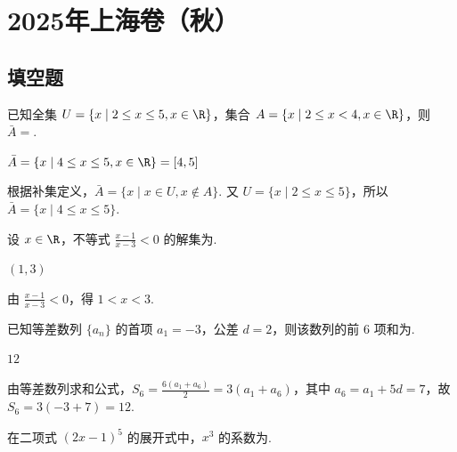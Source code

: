 \chapter{2025年上海卷（秋）}

\section{填空题}

\begin{problem}
已知全集 \(U = \{x \mid 2 \le x \le 5, x \in \R\}\)，集合 \(A = \{x \mid 2 \le x < 4, x \in \R\}\)，则 \(\bar{A} =\)\fillinblank{}.
\end{problem}

\begin{answer}
\(\bar{A} = \{x \mid 4 \le x \le 5, x \in \R\}=[4,5]\)
\end{answer}

\begin{solution}
根据补集定义，\(\bar{A} = \{x \mid x \in U, x \notin A\}\). 又 \(U=\{x\mid2\le x\le5\}\)，所以 \(\bar{A}=\{x\mid4\le x\le5\}\).
\end{solution}

\begin{problem}
设 \(x\in\R\)，不等式 \(\frac{x-1}{x-3}<0\) 的解集为\fillinblank{}.
\end{problem}

\begin{answer}
\((1,3)\)
\end{answer}

\begin{solution}
由 \(\frac{x-1}{x-3}<0\)，得 \(1<x<3\).
\end{solution}

\begin{problem}
已知等差数列 \(\{a_n\}\) 的首项 \(a_1 = -3\)，公差 \(d = 2\)，则该数列的前 \(6\) 项和为\fillinblank{}.
\end{problem}

\begin{answer}
\(12\)
\end{answer}

\begin{solution}
由等差数列求和公式，\(S_6 = \frac{6(a_1+a_6)}{2}=3(a_1+a_6)\)，其中 \(a_6=a_1+5d=7\)，故 \(S_6=3(-3+7)=12\).
\end{solution}

\begin{problem}
在二项式 \((2x-1)^5\) 的展开式中，\(x^3\) 的系数为\fillinblank{}.
\end{problem}


